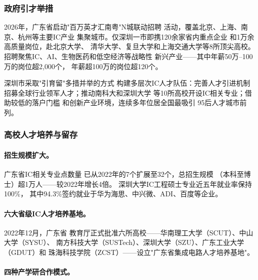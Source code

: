 \documentclass[12pt,a4paper]{article}
\begin{document}
\subsubsection{政府引才举措}

2026年，广东省启动"百万英才汇南粤"N城联动招聘
活动，覆盖北京、上海、南京、杭州等主要IC产业
集聚城市。仅深圳一市即携120余家省内重点企业
和1万余高质量岗位，赴北京大学、
清华大学、复旦大学和上海交通大学等8所顶尖高校。
招聘聚焦IC、AI、生物医药和低空经济等战略性
新兴产业——其中年薪50万--100万的岗位超2,000个，
年薪超100万的岗位超120个。

深圳市采取"引育留"多措并举的方式
构建多层次IC人才队伍：完善人才引进机制
招募全球行业领军人才；推动南科大和深圳大学
等10所高校开设IC相关专业；借助较低的落户门槛
和创新产业环境，连续多年位居全国最吸引
95后人才城市前列。

\subsubsection{高校人才培养与留存}

\paragraph{招生规模扩大。}广东省IC相关专业点数量
已从2022年的7个扩展至32个，总招生规模
（本科至博士）超1万人——较2022年增长4倍。
深圳大学IC工程硕士专业近五年就业率保持100\%，
其中94.3\%签约就业于华为海思、中兴微、ADI、百度等企业。

\paragraph{六大省级IC人才培养基地。}2022年12月，广东省
教育厅正式批准六所高校——华南理工大学（SCUT）、中山大学（SYSU）、
南方科技大学（SUSTech）、深圳大学（SZU）、广东工业大学（GDUT）和
珠海科技学院（ZCST）——设立"广东省集成电路人才培养基地"。

\paragraph{四种产学研合作模式。}
\end{document}

